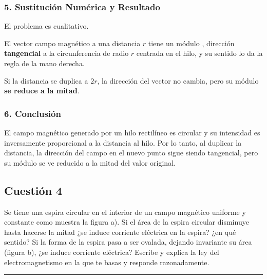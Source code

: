 \subsubsection*{5. Sustitución Numérica y Resultado}
El problema es cualitativo.
\begin{cajaresultado}
    El vector campo magnético a una distancia $r$ tiene un módulo , dirección \textbf{tangencial} a la circunferencia de radio $r$ centrada en el hilo, y su sentido lo da la regla de la mano derecha.
\end{cajaresultado}
\begin{cajaresultado}
    Si la distancia se duplica a $2r$, la dirección del vector no cambia, pero su módulo \textbf{se reduce a la mitad}.
\end{cajaresultado}

\subsubsection*{6. Conclusión}
\begin{cajaconclusion}
El campo magnético generado por un hilo rectilíneo es circular y su intensidad es inversamente proporcional a la distancia al hilo. Por lo tanto, al duplicar la distancia, la dirección del campo en el nuevo punto sigue siendo tangencial, pero su módulo se ve reducido a la mitad del valor original.
\end{cajaconclusion}

\newpage
\subsection{Cuestión 4}
\label{subsec:C4_2020_jul_ext_b}

\begin{cajaenunciado}
Se tiene una espira circular en el interior de un campo magnético uniforme y constante como muestra la figura a). Si el área de la espira circular disminuye hasta hacerse la mitad ¿se induce corriente eléctrica en la espira? ¿en qué sentido? Si la forma de la espira pasa a ser ovalada, dejando invariante su área (figura b), ¿se induce corriente eléctrica? Escribe y explica la ley del electromagnetismo en la que te basas y responde razonadamente.
\end{cajaenunciado}
\hrule

